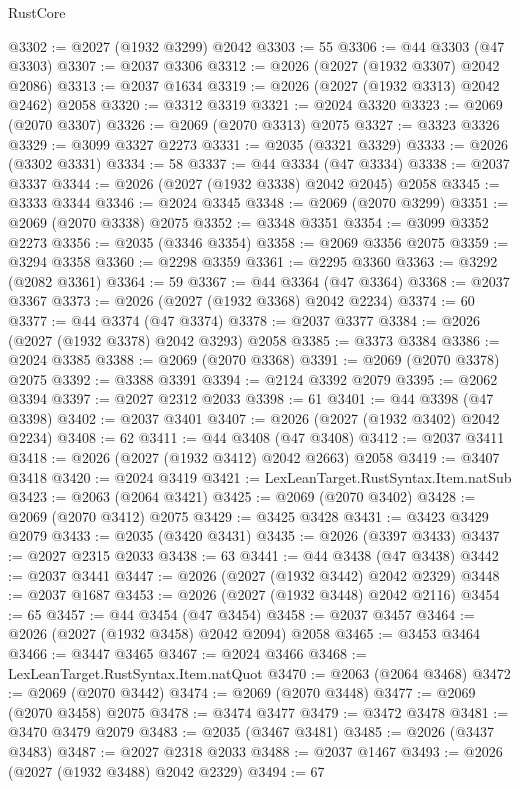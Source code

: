 \begin{lexlean}{RustCore}
\begin{coremodule}
@3302 := @2027 (@1932 @3299) @2042
@3303 := 55
@3306 := @44 @3303 (@47 @3303)
@3307 := @2037 @3306
@3312 := @2026 (@2027 (@1932 @3307) @2042 @2086)
@3313 := @2037 @1634
@3319 := @2026 (@2027 (@1932 @3313) @2042 @2462) @2058
@3320 := @3312 @3319
@3321 := @2024 @3320
@3323 := @2069 (@2070 @3307)
@3326 := @2069 (@2070 @3313) @2075
@3327 := @3323 @3326
@3329 := @3099 @3327 @2273
@3331 := @2035 (@3321 @3329)
@3333 := @2026 (@3302 @3331)
@3334 := 58
@3337 := @44 @3334 (@47 @3334)
@3338 := @2037 @3337
@3344 := @2026 (@2027 (@1932 @3338) @2042 @2045) @2058
@3345 := @3333 @3344
@3346 := @2024 @3345
@3348 := @2069 (@2070 @3299)
@3351 := @2069 (@2070 @3338) @2075
@3352 := @3348 @3351
@3354 := @3099 @3352 @2273
@3356 := @2035 (@3346 @3354)
@3358 := @2069 @3356 @2075
@3359 := @3294 @3358
@3360 := @2298 @3359
@3361 := @2295 @3360
@3363 := @3292 (@2082 @3361)
@3364 := 59
@3367 := @44 @3364 (@47 @3364)
@3368 := @2037 @3367
@3373 := @2026 (@2027 (@1932 @3368) @2042 @2234)
@3374 := 60
@3377 := @44 @3374 (@47 @3374)
@3378 := @2037 @3377
@3384 := @2026 (@2027 (@1932 @3378) @2042 @3293) @2058
@3385 := @3373 @3384
@3386 := @2024 @3385
@3388 := @2069 (@2070 @3368)
@3391 := @2069 (@2070 @3378) @2075
@3392 := @3388 @3391
@3394 := @2124 @3392 @2079
@3395 := @2062 @3394
@3397 := @2027 @2312 @2033
@3398 := 61
@3401 := @44 @3398 (@47 @3398)
@3402 := @2037 @3401
@3407 := @2026 (@2027 (@1932 @3402) @2042 @2234)
@3408 := 62
@3411 := @44 @3408 (@47 @3408)
@3412 := @2037 @3411
@3418 := @2026 (@2027 (@1932 @3412) @2042 @2663) @2058
@3419 := @3407 @3418
@3420 := @2024 @3419
@3421 := LexLeanTarget.RustSyntax.Item.natSub
@3423 := @2063 (@2064 @3421)
@3425 := @2069 (@2070 @3402)
@3428 := @2069 (@2070 @3412) @2075
@3429 := @3425 @3428
@3431 := @3423 @3429 @2079
@3433 := @2035 (@3420 @3431)
@3435 := @2026 (@3397 @3433)
@3437 := @2027 @2315 @2033
@3438 := 63
@3441 := @44 @3438 (@47 @3438)
@3442 := @2037 @3441
@3447 := @2026 (@2027 (@1932 @3442) @2042 @2329)
@3448 := @2037 @1687
@3453 := @2026 (@2027 (@1932 @3448) @2042 @2116)
@3454 := 65
@3457 := @44 @3454 (@47 @3454)
@3458 := @2037 @3457
@3464 := @2026 (@2027 (@1932 @3458) @2042 @2094) @2058
@3465 := @3453 @3464
@3466 := @3447 @3465
@3467 := @2024 @3466
@3468 := LexLeanTarget.RustSyntax.Item.natQuot
@3470 := @2063 (@2064 @3468)
@3472 := @2069 (@2070 @3442)
@3474 := @2069 (@2070 @3448)
@3477 := @2069 (@2070 @3458) @2075
@3478 := @3474 @3477
@3479 := @3472 @3478
@3481 := @3470 @3479 @2079
@3483 := @2035 (@3467 @3481)
@3485 := @2026 (@3437 @3483)
@3487 := @2027 @2318 @2033
@3488 := @2037 @1467
@3493 := @2026 (@2027 (@1932 @3488) @2042 @2329)
@3494 := 67

\end{coremodule}
\end{lexlean}

